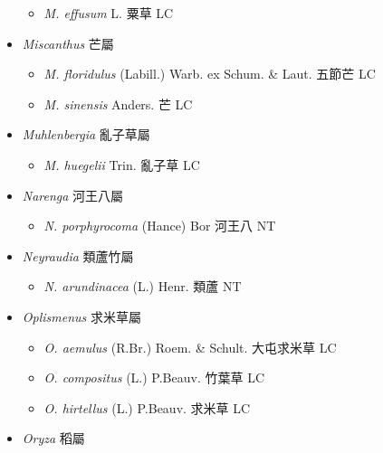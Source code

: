 \begin{itemize}
  \begin{itemize}
        \item[] \textit{M. effusum} L.  粟草   LC
  \end{itemize}
 \item[] \textit{Miscanthus} 芒屬
                                
  \begin{itemize}
        \item[] \textit{M. floridulus} (Labill.) Warb. ex Schum. \& Laut.  五節芒   LC
        \item[] \textit{M. sinensis} Anders.  芒   LC
  \end{itemize}
 \item[] \textit{Muhlenbergia} 亂子草屬
                                
  \begin{itemize}
        \item[] \textit{M. huegelii} Trin.  亂子草   LC
  \end{itemize}
 \item[] \textit{Narenga} 河王八屬
                                
  \begin{itemize}
        \item[] \textit{N. porphyrocoma} (Hance) Bor  河王八   NT
  \end{itemize}
 \item[] \textit{Neyraudia} 類蘆竹屬
                                
  \begin{itemize}
        \item[] \textit{N. arundinacea} (L.) Henr.  類蘆   NT
  \end{itemize}
 \item[] \textit{Oplismenus} 求米草屬
                                
  \begin{itemize}
        \item[] \textit{O. aemulus} (R.Br.) Roem. \& Schult.  大屯求米草   LC
        \item[] \textit{O. compositus} (L.) P.Beauv.  竹葉草   LC
        \item[] \textit{O. hirtellus} (L.) P.Beauv.  求米草   LC
  \end{itemize}
 \item[] \textit{Oryza} 稻屬
                                

\end{itemize}
